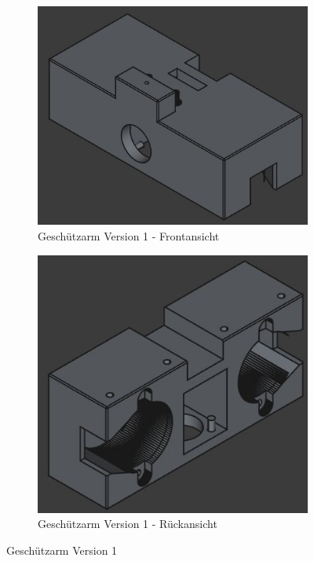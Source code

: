 \begin{figure}[h]
    \centering

    \begin{subfigure}[b]{0.45\textwidth}
        \centering
        \includegraphics[width=\textwidth]{images/cad_gunarm_v1_front.jpg}
        \caption{Geschützarm Version 1 - Frontansicht}
    \end{subfigure}
    \hfill
    \begin{subfigure}[b]{0.45\textwidth}
        \centering
        \includegraphics[width=\textwidth]{images/cad_gunarm_v1_back.jpg}
        \caption{Geschützarm Version 1 - Rückansicht}
    \end{subfigure}

    \caption{Geschützarm Version 1}
    \label{fig:gunarm_v1}
\end{figure}

